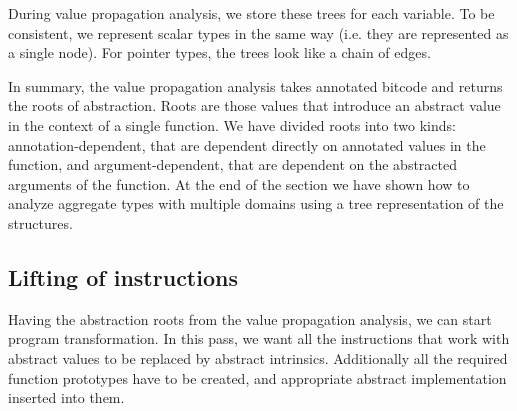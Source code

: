\begin{example}
\begin{center}
\begin{minipage}[t]{.47\textwidth}
\end{minipage}
\end{center}
\end{example}

During value propagation analysis, we store these trees for each variable.
To be consistent, we represent scalar types in the same way (i.e. they are
represented as a single node). For pointer types, the trees look like a chain of
 edges.

\begin{summary}
In summary, the value propagation analysis takes annotated \LLVM bitcode and
returns the roots of abstraction. Roots are those \LLVM values that introduce an
abstract value in the context of a single function. We have divided roots into two
kinds: annotation-dependent, that are dependent directly on annotated values
in the function, and argument-dependent, that are dependent
on the abstracted arguments of the function. At the end of the section we
have shown how to analyze aggregate types with multiple domains using a tree
representation of the structures.
\end{summary}

\subsection{Lifting of instructions}
Having the abstraction roots from the value propagation analysis, we can
start program transformation. In this \LLVM pass, we want all the instructions
that work with abstract values to be replaced by abstract intrinsics.
Additionally all the required function prototypes have to be created, and
appropriate abstract implementation inserted into them.

